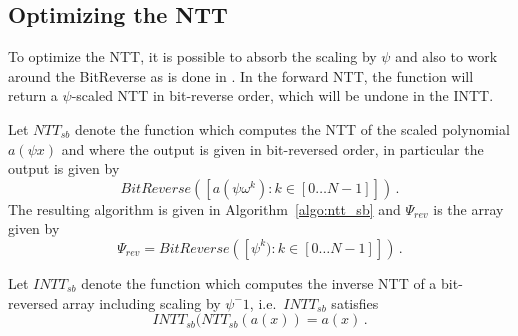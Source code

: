 \subsection{Optimizing the NTT}

To optimize the NTT, it is possible to absorb the scaling by $\psi$ and also to work around 
the BitReverse as is done in \cite{longa}.  In the forward NTT, the function will return a $\psi$-scaled NTT
in bit-reverse order, which will be undone in the INTT.

Let $NTT_{sb}$ denote the function which computes the NTT of the scaled polynomial $a(\psi x)$ and where the output 
is given in bit-reversed order, in particular the output is given by 
\[  BitReverse(  [a(\psi \omega^{k}) : k \in [0 \ldots N-1]]   ) \, .  \]
The resulting algorithm is given in Algorithm~\ref{algo:ntt_sb} and $\Psi_{rev}$ is the 
array given by 
\[ \Psi_{rev} = BitReverse( [ \psi^{k}) : k \in [0 \ldots N-1]] ) \, . \]

\begin{algorithm}[!t] \label{algo:ntt_sb}
\begin{scriptsize}
\caption{\emph{$NTT_{sb}$}}
\end{scriptsize}
\end{algorithm} 

Let $INTT_{sb}$ denote the function which computes the inverse NTT of a bit-reversed array 
including scaling by $\psi^-1$, i.e.\ $INTT_{sb}$ satisfies
\[ INTT_{sb} (NTT_{sb}(a(x)) = a(x) \, . \]

